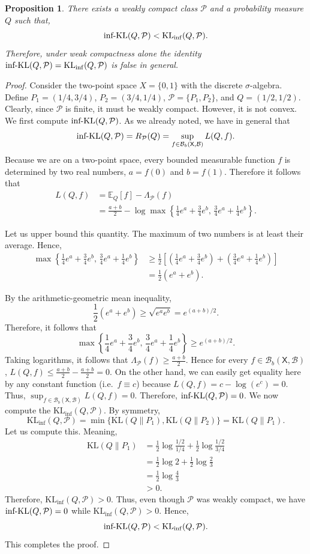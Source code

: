 \documentclass[11pt]{article}
\newcommand{\KL}{\mathrm{KL}}
\newcommand{\KLinf}{\mathrm{KL}_{\mathrm{inf}}}
\newcommand{\infKL}{\textnormal{inf-KL}}
\newcommand{\E}{\mathbb{E}}
\newcommand{\Pcal}{\mathcal{P}}
\newcommand{\X}{\mathsf{X}}
\newcommand{\B}{\mathcal{B}}
\newtheorem{proposition}[theorem]{Proposition}
\theoremstyle{definition}
\theoremstyle{definition}
\begin{document}
\begin{proposition}\label{prop:weakly-compact-not-enough}
There exists a weakly compact class $\Pcal$ and a probability measure $Q$ such that,
\[
\infKL(Q,\Pcal)<\KLinf(Q,\Pcal).
\]
Therefore, under weak compactness alone the identity $\infKL(Q,\Pcal)=\KLinf(Q,\Pcal)$ is false in general.
\end{proposition}

\begin{proof}
Consider the two-point space $X=\{0,1\}$ with the discrete $\sigma$-algebra. Define $P_1=(1/4, 3/4)$, $P_2=(3/4, 1/4)$, $\Pcal=\{P_1,P_2\}$, and $Q=(1/2,1/2)$. Clearly, since $\Pcal$ is finite, it must be weakly compact. However, it is not convex. We first compute $\infKL(Q,\Pcal)$. As we already noted, we have in general that
\[
\infKL(Q,\Pcal) = R_{\Pcal}(Q) = \sup_{f\in\mathcal B_b(\X,\B)}L(Q,f).
\]
Because we are on a two-point space, every bounded measurable function $f$ is determined by two real numbers, $a=f(0)$ and $b=f(1)$. Therefore it follows that
\begin{align*}
L(Q,f)&=\E_Q[f]-\Lambda_{\Pcal}(f)\\
&=\frac{a+b}{2}-\log\max\left\{\frac14 e^a+\frac34 e^b,\, \frac34 e^a+\frac14 e^b \right\}.
\end{align*}

Let us upper bound this quantity. The maximum of two numbers is at least their average. Hence,
\begin{align*}
\max\left\{\frac14 e^a+\frac34 e^b,\,\frac34 e^a+\frac14 e^b \right\}
&\ge \frac12 \left[\left(\frac14 e^a+\frac34 e^b\right)+\left(\frac34 e^a+\frac14 e^b\right) \right]\\
&=\frac12(e^a+e^b).
\end{align*}

By the arithmetic-geometric mean inequality,
\[
\frac12(e^a+e^b)\ge\sqrt{e^a e^b}=e^{(a+b)/2}.
\]
Therefore, it follows that
\[
\max\left\{ \frac14 e^a+\frac34 e^b,\, \frac34 e^a+\frac14 e^b \right\} \ge e^{(a+b)/2}.
\]
Taking logarithms, it follows that $\Lambda_{\Pcal}(f)\ge \frac{a+b}{2}$. Hence for every $f\in\mathcal B_b(\X,\B)$, $L(Q,f)\le \frac{a+b}{2}-\frac{a+b}{2}=0$. On the other hand, we can easily get equality here by any constant function (i.e.\, $f\equiv c$) because $L(Q,f)=c-\log(e^c)=0$. Thus, $\sup_{f\in\mathcal B_b(\X,\B)}L(Q,f)=0$. Therefore, \underline{$\infKL(Q,\Pcal)=0$}. We now compute the $\KLinf(Q,\Pcal)$. By symmetry,
\[
\KLinf(Q,\Pcal)=\min\{\KL(Q\|P_1),\KL(Q\|P_2)\}=\KL(Q\|P_1).
\]
Let us compute this. Meaning,
\begin{align*}
\KL(Q\|P_1)&=\frac12\log\frac{1/2}{1/4}+ \frac12\log\frac{1/2}{3/4}\\
&=\frac12\log 2+\frac12\log\frac23\\
&=\frac12\log\frac43\\
&>0.
\end{align*}
Therefore, $\KLinf(Q,\mathcal P)>0$. Thus, even though $\Pcal$ was weakly compact, we have $\infKL(Q,\Pcal)=0$ while $\KLinf(Q,\Pcal)>0$. Hence,
\[
\infKL(Q,\Pcal)<\KLinf(Q,\Pcal).
\]
This completes the proof.
\end{proof}
\end{document}
